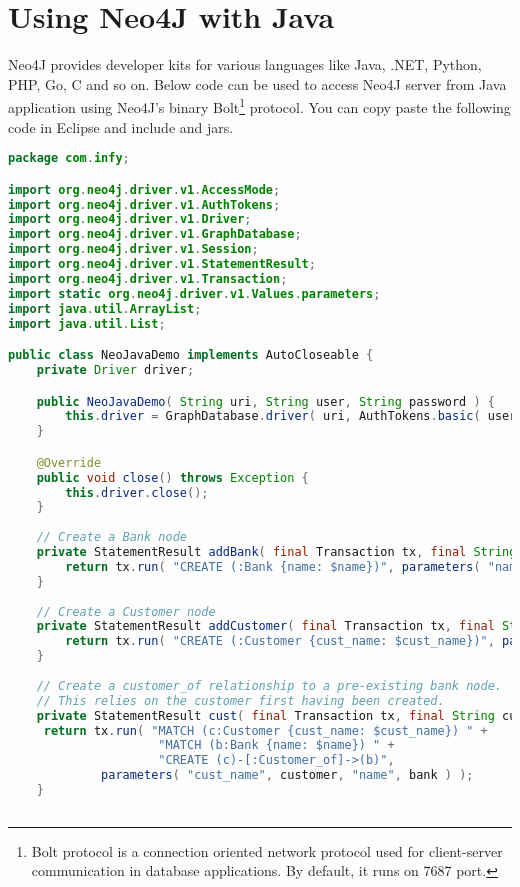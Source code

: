 \documentclass[../main.tex]{subfiles}
\begin{document}
\section{Using Neo4J with Java}
Neo4J provides developer kits for various languages like Java, .NET, Python, PHP, Go, C and so on. Below code can be used to access Neo4J server from Java application using Neo4J's binary Bolt\footnote{Bolt protocol is a connection oriented network protocol used for client-server communication in database applications. By default, it runs on 7687 port.} protocol.
You can copy paste the following code in Eclipse and include \href{https://mvnrepository.com/artifact/org.neo4j/neo4j}{\color{blue}{neo4j}} and \href{https://mvnrepository.com/artifact/org.neo4j.driver/neo4j-java-driver}{\color{blue}{neo4j-java driver}} jars.
\begin{lstlisting}[language=java, caption={Neo4J with java}]
package com.infy;

import org.neo4j.driver.v1.AccessMode;
import org.neo4j.driver.v1.AuthTokens;
import org.neo4j.driver.v1.Driver;
import org.neo4j.driver.v1.GraphDatabase;
import org.neo4j.driver.v1.Session;
import org.neo4j.driver.v1.StatementResult;
import org.neo4j.driver.v1.Transaction;
import static org.neo4j.driver.v1.Values.parameters;
import java.util.ArrayList;
import java.util.List;

public class NeoJavaDemo implements AutoCloseable {
    private Driver driver;

    public NeoJavaDemo( String uri, String user, String password ) {
        this.driver = GraphDatabase.driver( uri, AuthTokens.basic( user, password ) );
    }

    @Override
    public void close() throws Exception {
        this.driver.close();
    }
    
    // Create a Bank node
    private StatementResult addBank( final Transaction tx, final String name ) {
        return tx.run( "CREATE (:Bank {name: $name})", parameters( "name", name ) );
    }
    
    // Create a Customer node
    private StatementResult addCustomer( final Transaction tx, final String cust_name ) {
        return tx.run( "CREATE (:Customer {cust_name: $cust_name})", parameters( "cust_name", cust_name ) );
    }
    
    // Create a customer_of relationship to a pre-existing bank node.
    // This relies on the customer first having been created.
    private StatementResult cust( final Transaction tx, final String customer, final String bank ) {
     return tx.run( "MATCH (c:Customer {cust_name: $cust_name}) " +
                     "MATCH (b:Bank {name: $name}) " +
                     "CREATE (c)-[:Customer_of]->(b)",
             parameters( "cust_name", customer, "name", bank ) );
    }
    

\end{lstlisting}
\end{document}
